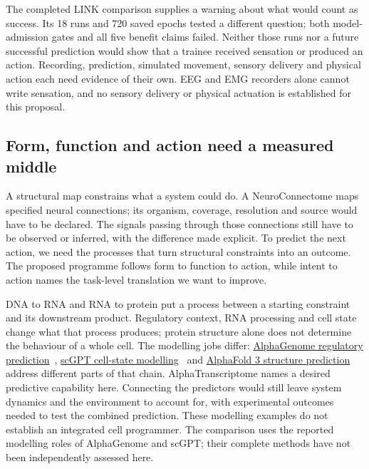 The completed LINK comparison supplies a warning about what would count as
success. Its 18 runs and 720 saved epochs tested a different question; both
model-admission gates and all five benefit claims failed. Neither those runs
nor a future successful prediction would show that a trainee received sensation
or produced an action. Recording, prediction, simulated movement, sensory
delivery and physical action each need evidence of their own. EEG and EMG
recorders alone cannot write sensation, and no sensory delivery or physical
actuation is established for this proposal.

\subsection{Form, function and action need a measured middle}
A structural map constrains what a system could do. A NeuroConnectome maps
specified neural connections; its organism, coverage, resolution and source
would have to be declared. The signals passing through those connections
still have to be observed or inferred, with the difference made explicit.
To predict the next action, we need the processes that turn structural
constraints into an outcome. The proposed programme follows form to function
to action, while intent to action names the task-level translation we want
to improve.

DNA to RNA and RNA to protein put a process between a starting constraint and
its downstream product. Regulatory context, RNA processing and cell state
change what that process produces; protein structure alone does not determine
the behaviour of a whole cell. The modelling jobs differ:
\href{https://www.nature.com/articles/s41586-025-10014-0}{AlphaGenome regulatory prediction}~\cite{alphagenomeRetained},
\href{https://www.nature.com/articles/s41592-024-02201-0}{scGPT cell-state modelling}~\cite{scgptRetained} and
\href{https://www.nature.com/articles/s41586-024-07487-w}{AlphaFold 3 structure prediction}~\cite{alphafold32024}
address different parts of that chain. AlphaTranscriptome names a desired
predictive capability here. Connecting the predictors would still leave system
dynamics and the environment to account for, with experimental outcomes needed
to test the combined prediction. These modelling examples do not establish an
integrated cell programmer. The comparison uses the reported modelling roles of
AlphaGenome and scGPT; their complete methods have not been independently
assessed here.


